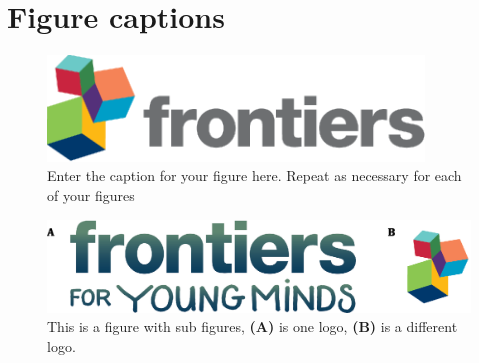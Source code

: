 \documentclass[utf8]{frontiersSCNS} %
\begin{document}
\section*{Figure captions}


\begin{figure}[h!]
\begin{center}
\includegraphics[width=10cm]{logo1}%
\end{center}
\caption{ Enter the caption for your figure here.  Repeat as  necessary for each of your figures}\label{fig:1}
\end{figure}


\begin{figure}[h!]
\begin{center}
\includegraphics[width=15cm]{logos}
\end{center}
\caption{This is a figure with sub figures, \textbf{(A)} is one logo, \textbf{(B)} is a different logo.}\label{fig:2}
\end{figure}

\end{document}
